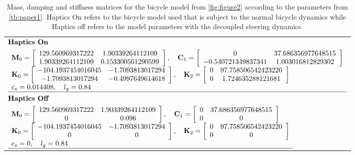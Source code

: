 \begin{table}[h]
    \caption{Mass, damping and stiffness matrices for the bicycle model from \cref{fig:figure2} according to the parameters from \cref{tb:paper1}. Haptics On refers to the bicycle model used that is subject to the normal bicycle dynamics while Haptics off refers to  the model parameters with the decoupled steering dynamics.}
\begin{tabular}{l}

           {$\!\begin{aligned}    &\textbf{Haptics On}\\
          &\begin{array}{l}{\mathbf{M}_{0}=\left[\begin{array}{cc}{129.560969317222} & {1.90339264112109} \\ {1.90339264112109} & {0.153300561290599}\end{array}\right], \quad \mathbf{C}_{1}=\left[\begin{array}{cc}{0} & {37.686356977648515} \\ {-0.540721349837341} & {1.003016812829302}\end{array}\right]} \\ {\mathbf{K}_{0}=\left[\begin{array}{cc}{-104.1937454016045} & {-1.7093813017294}  \\ {-1.7093813017294} & {-0.4997649614618}\end{array}\right], \quad \mathbf{K}_{2}=\left[\begin{array}{ccc}{0} & {97.758506542423220} \\  {0} & {1.724635288121681}\end{array}\right]} \\ {c_s}= {0.014408} , \quad l_g=0.84  \\ \hline\end{array}\\
              &\textbf{Haptics Off}\\
          &\begin{array}{l}{\mathbf{M}_{0}=\left[\begin{array}{cc}{129.560969317222} & {1.90339264112109} \\ {0} & {0.096}\end{array}\right], \quad \mathbf{C}_{1}=\left[\begin{array}{cc}{0} & {37.686356977648515} \\ {0} & {0}\end{array}\right]} \\ {\mathbf{K}_{0}=\left[\begin{array}{cc}{-104.1937454016045} & {-1.7093813017294}  \\ {0} & {0}\end{array}\right], \quad \mathbf{K}_{2}=\left[\begin{array}{ccc}{0} & {97.758506542423220} \\  {0} & {0}\end{array}\right]} \\ {c_s}= {0} , \quad l_g=0.84  \\ \hline\end{array}\end{aligned}$}
  \end{tabular}
\end{table}